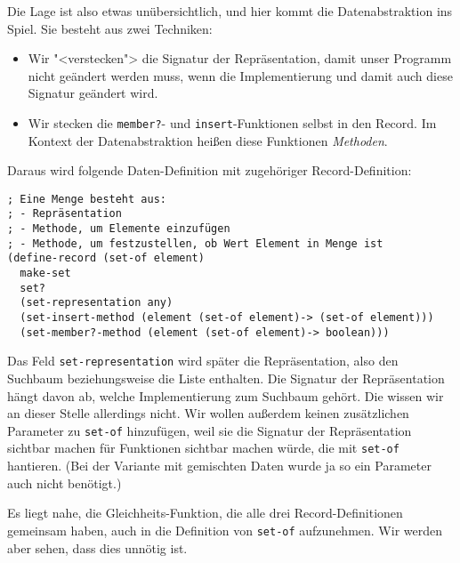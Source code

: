 Die Lage ist also etwas unübersichtlich, und hier kommt die
Datenabstraktion ins Spiel.  Sie besteht aus zwei Techniken:
%
\begin{itemize}
\item Wir "<verstecken"> die Signatur der Repräsentation, damit unser
  Programm nicht geändert werden muss, wenn die Implementierung und
  damit auch diese Signatur geändert wird.
\item Wir stecken die \lstinline{member?}- und
  \lstinline{insert}-Funktionen selbst in den Record.  Im Kontext der
  Datenabstraktion heißen diese Funktionen
  \textit{Methoden}.
\end{itemize}
% 
Daraus wird folgende Daten-Definition mit zugehöriger
Record-Definition:
%
\begin{lstlisting}
; Eine Menge besteht aus:
; - Repräsentation
; - Methode, um Elemente einzufügen
; - Methode, um festzustellen, ob Wert Element in Menge ist
(define-record (set-of element)
  make-set
  set?
  (set-representation any)
  (set-insert-method (element (set-of element)-> (set-of element)))
  (set-member?-method (element (set-of element)-> boolean)))
\end{lstlisting}
%
Das Feld \lstinline{set-representation} wird später die
Repräsentation, also den Suchbaum beziehungsweise die Liste enthalten.
Die Signatur der Repräsentation hängt davon ab, welche Implementierung
zum Suchbaum gehört. Die wissen wir an dieser Stelle allerdings nicht.
Wir wollen außerdem keinen zusätzlichen Parameter zu
\lstinline{set-of} hinzufügen, weil sie die Signatur der
Repräsentation sichtbar machen für Funktionen sichtbar machen würde,
die mit \lstinline{set-of} hantieren.  (Bei der Variante mit
gemischten Daten wurde ja so ein Parameter auch nicht benötigt.)

Es liegt nahe, die Gleichheits-Funktion, die alle drei
Record-Definitionen gemeinsam haben, auch in die Definition von
\lstinline{set-of} aufzunehmen.  Wir werden aber sehen, dass dies
unnötig ist.

